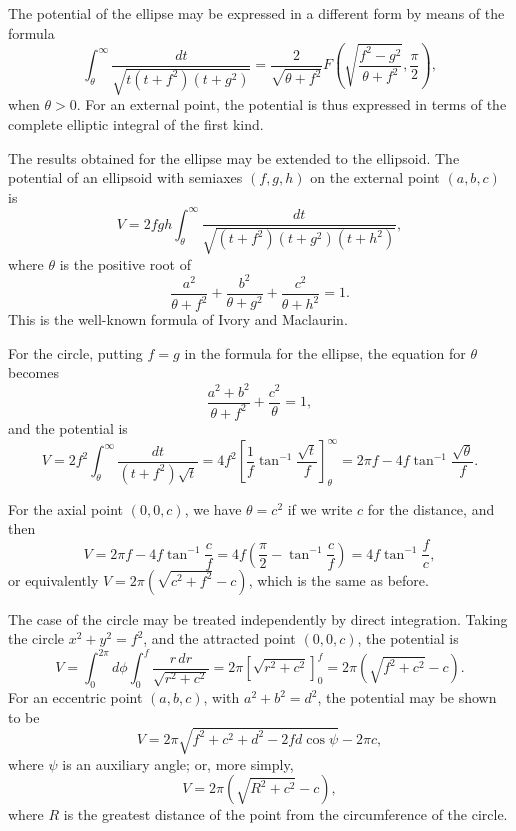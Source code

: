 \documentclass[11pt,a4paper]{book}
\begin{document}
\begin{art}
The potential of the ellipse may be expressed in a different form by means of the formula
\[
\int_{\theta}^{\infty} \frac{dt}{\sqrt{t(t+f^2)(t+g^2)}}
= \frac{2}{\sqrt{\theta + f^2}}F\left(\sqrt{\frac{f^2-g^2}{\theta+f^2}}, \frac{\pi}{2}\right),
\]
when $\theta > 0$. For an external point, the potential is thus expressed in terms of the complete elliptic integral of the first kind.
\end{art}

\begin{art}
The results obtained for the ellipse may be extended to the ellipsoid. The potential of an ellipsoid with semiaxes $(f, g, h)$ on the external point $(a, b, c)$ is
\[
V = 2fgh\int_{\theta}^{\infty} \frac{dt}{\sqrt{(t+f^2)(t+g^2)(t+h^2)}},
\]
where $\theta$ is the positive root of
\[
\frac{a^2}{\theta+f^2} + \frac{b^2}{\theta+g^2} + \frac{c^2}{\theta+h^2} = 1.
\]
This is the well-known formula of Ivory and Maclaurin.
\end{art}

\begin{art}
For the circle, putting $f=g$ in the formula for the ellipse, the equation for $\theta$ becomes
\[
\frac{a^2+b^2}{\theta+f^2} + \frac{c^2}{\theta} = 1,
\]
and the potential is
\[
V = 2f^2\int_{\theta}^{\infty} \frac{dt}{(t+f^2)\sqrt{t}}
= 4f^2\left[\frac{1}{f}\tan^{-1}\frac{\sqrt{t}}{f}\right]_{\theta}^{\infty}
= 2\pi f - 4f\tan^{-1}\frac{\sqrt{\theta}}{f}.
\]
\end{art}

\begin{art}
For the axial point $(0, 0, c)$, we have $\theta = c^2$ if we write $c$ for the distance, and then
\[
V = 2\pi f - 4f\tan^{-1}\frac{c}{f}
= 4f\left(\frac{\pi}{2} - \tan^{-1}\frac{c}{f}\right)
= 4f\tan^{-1}\frac{f}{c},
\]
or equivalently $V = 2\pi(\sqrt{c^2+f^2} - c)$, which is the same as before.
\end{art}

\begin{art}
The case of the circle may be treated independently by direct integration. Taking the circle $x^2 + y^2 = f^2$, and the attracted point $(0, 0, c)$, the potential is
\[
V = \int_0^{2\pi} d\phi \int_0^f \frac{r\,dr}{\sqrt{r^2 + c^2}}
= 2\pi\left[\sqrt{r^2+c^2}\right]_0^f
= 2\pi(\sqrt{f^2+c^2} - c).
\]
For an eccentric point $(a, b, c)$, with $a^2 + b^2 = d^2$, the potential may be shown to be
\[
V = 2\pi\sqrt{f^2 + c^2 + d^2 - 2fd\cos\psi} - 2\pi c,
\]
where $\psi$ is an auxiliary angle; or, more simply,
\[
V = 2\pi(\sqrt{R^2 + c^2} - c),
\]
where $R$ is the greatest distance of the point from the circumference of the circle.
\end{art}
\end{document}
